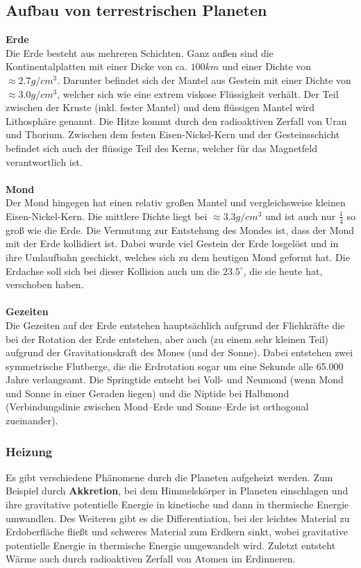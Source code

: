 \documentclass[a4paper,12pt]{article}
\begin{document}
\subsection{Aufbau von terrestrischen Planeten}
\textbf{Erde}\\
Die Erde besteht aus mehreren Schichten. Ganz außen sind die Kontinentalplatten mit einer Dicke von ca. $100km$ und einer Dichte von $\approx 2.7g/cm^3$. Darunter befindet sich der Mantel aus Gestein mit einer Dichte von $\approx 3.0g/cm^3$, welcher sich wie eine extrem viskose Flüssigkeit verhält. Der Teil zwischen der Kruste (inkl. fester Mantel) und dem flüssigen Mantel wird Lithosphäre genannt. Die Hitze kommt durch den radioaktiven Zerfall von Uran und Thorium. Zwischen dem festen Eisen-Nickel-Kern und der Gesteinsschicht befindet sich auch der flüssige Teil des Kerns, welcher für das Magnetfeld verantwortlich ist.
\\\hfill\\\textbf{Mond}\\ 
Der Mond hingegen hat einen relativ großen Mantel und vergleichsweise kleinen Eisen-Nickel-Kern. Die mittlere Dichte liegt bei $\approx 3.3g/cm^3$ und ist auch nur $\tfrac{1}{4}$ so groß wie die Erde. Die Vermutung zur Entstehung des Mondes ist, dass der Mond mit der Erde kollidiert ist. Dabei wurde viel Gestein der Erde losgelöst und in ihre Umlaufbahn geschickt, welches sich zu dem heutigen Mond geformt hat. Die Erdachse soll sich bei dieser Kollision auch um die $23.5^{\circ}$, die sie heute hat, verschoben haben.
\\\hfill\\\textbf{Gezeiten}\\ 
Die Gezeiten auf der Erde entstehen hauptsächlich aufgrund der Fliehkräfte die bei der Rotation der Erde entstehen, aber auch (zu einem sehr kleinen Teil) aufgrund der Gravitationskraft des Mones (und der Sonne). Dabei entstehen zwei symmetrische Flutberge, die die Erdrotation sogar um eine Sekunde alle 65.000 Jahre verlangsamt. Die Springtide entseht bei Voll- und Neumond (wenn Mond und Sonne in einer Geraden liegen) und die Niptide bei Halbmond (Verbindungslinie zwischen Mond--Erde und Sonne--Erde ist orthogonal zueinander).

\subsubsection{Heizung}
Es gibt verschiedene Phänomene durch die Planeten aufgeheizt werden. Zum Beispiel durch \textbf{Akkretion}, bei dem Himmelskörper in Planeten einschlagen und ihre gravitative potentielle Energie in kinetische und dann in thermische Energie umwandlen. Des Weiteren gibt es die Differentiation, bei der leichtes Material zu Erdoberfläche fließt und schweres Material zum Erdkern sinkt, wobei gravitative potentielle Energie in thermische Energie umgewandelt wird. Zuletzt entsteht Wärme auch durch radioaktiven Zerfall von Atomen im Erdinneren.
\end{document}
